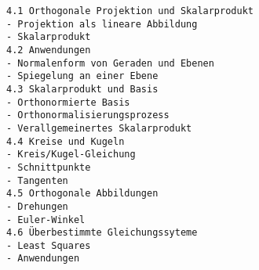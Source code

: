 \begin{verbatim}
4.1 Orthogonale Projektion und Skalarprodukt
- Projektion als lineare Abbildung
- Skalarprodukt
4.2 Anwendungen
- Normalenform von Geraden und Ebenen
- Spiegelung an einer Ebene
4.3 Skalarprodukt und Basis
- Orthonormierte Basis
- Orthonormalisierungsprozess
- Verallgemeinertes Skalarprodukt
4.4 Kreise und Kugeln
- Kreis/Kugel-Gleichung
- Schnittpunkte
- Tangenten
4.5 Orthogonale Abbildungen
- Drehungen
- Euler-Winkel
4.6 Überbestimmte Gleichungssyteme
- Least Squares
- Anwendungen
\end{verbatim}
